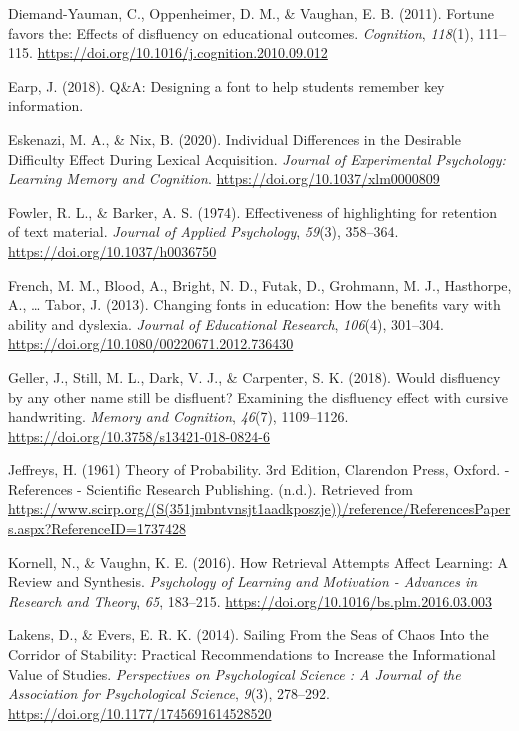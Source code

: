 \documentclass[english,pdf]{apa6}
\begin{document}
\leavevmode\hypertarget{ref-Diemand-Yauman2011}{}%
Diemand-Yauman, C., Oppenheimer, D. M., \& Vaughan, E. B. (2011). Fortune favors the: Effects of disfluency on educational outcomes. \emph{Cognition}, \emph{118}(1), 111--115. \url{https://doi.org/10.1016/j.cognition.2010.09.012}

\leavevmode\hypertarget{ref-Earp2018}{}%
Earp, J. (2018). Q\&A: Designing a font to help students remember key information.

\leavevmode\hypertarget{ref-Eskenazi2020}{}%
Eskenazi, M. A., \& Nix, B. (2020). Individual Differences in the Desirable Difficulty Effect During Lexical Acquisition. \emph{Journal of Experimental Psychology: Learning Memory and Cognition}. \url{https://doi.org/10.1037/xlm0000809}

\leavevmode\hypertarget{ref-Fowler1974}{}%
Fowler, R. L., \& Barker, A. S. (1974). Effectiveness of highlighting for retention of text material. \emph{Journal of Applied Psychology}, \emph{59}(3), 358--364. \url{https://doi.org/10.1037/h0036750}

\leavevmode\hypertarget{ref-French2013}{}%
French, M. M., Blood, A., Bright, N. D., Futak, D., Grohmann, M. J., Hasthorpe, A., \ldots{} Tabor, J. (2013). Changing fonts in education: How the benefits vary with ability and dyslexia. \emph{Journal of Educational Research}, \emph{106}(4), 301--304. \url{https://doi.org/10.1080/00220671.2012.736430}

\leavevmode\hypertarget{ref-Geller2018}{}%
Geller, J., Still, M. L., Dark, V. J., \& Carpenter, S. K. (2018). Would disfluency by any other name still be disfluent? Examining the disfluency effect with cursive handwriting. \emph{Memory and Cognition}, \emph{46}(7), 1109--1126. \url{https://doi.org/10.3758/s13421-018-0824-6}

\leavevmode\hypertarget{ref-Jeff1961}{}%
Jeffreys, H. (1961) Theory of Probability. 3rd Edition, Clarendon Press, Oxford. - References - Scientific Research Publishing. (n.d.). Retrieved from \url{https://www.scirp.org/(S(351jmbntvnsjt1aadkposzje))/reference/ReferencesPapers.aspx?ReferenceID=1737428}

\leavevmode\hypertarget{ref-Kornell2016}{}%
Kornell, N., \& Vaughn, K. E. (2016). How Retrieval Attempts Affect Learning: A Review and Synthesis. \emph{Psychology of Learning and Motivation - Advances in Research and Theory}, \emph{65}, 183--215. \url{https://doi.org/10.1016/bs.plm.2016.03.003}

\leavevmode\hypertarget{ref-Lakens2014}{}%
Lakens, D., \& Evers, E. R. K. (2014). Sailing From the Seas of Chaos Into the Corridor of Stability: Practical Recommendations to Increase the Informational Value of Studies. \emph{Perspectives on Psychological Science : A Journal of the Association for Psychological Science}, \emph{9}(3), 278--292. \url{https://doi.org/10.1177/1745691614528520}
\end{document}
